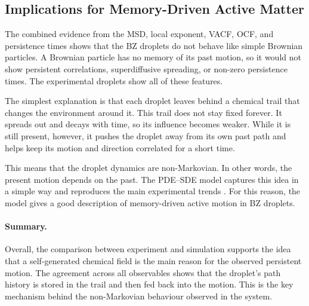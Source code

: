 \subsection{Implications for Memory-Driven Active Matter}
\label{subsec:comp_implications}

The combined evidence from the MSD, local exponent, VACF, OCF, and persistence times shows that the BZ droplets do not behave like simple Brownian particles. A Brownian particle has no memory of its past motion\cite{klafter2011,resnick1992}, so it would not show persistent correlations, superdiffusive spreading, or non-zero persistence times. The experimental droplets show all of these features.

The simplest explanation is that each droplet leaves behind a chemical trail that changes the environment around it. This trail does not stay fixed forever. It spreads out and decays with time, so its influence becomes weaker. While it is still present, however, it pushes the droplet away from its own past path and helps keep its motion and direction correlated for a short time.

This means that the droplet dynamics are non-Markovian\cite{schutz2004,balakrishnan2021}. In other words, the present motion depends on the past. The PDE--SDE model captures this idea in a simple way and reproduces the main experimental trends \cite{droplet2025}. For this reason, the model gives a good description of memory-driven active motion in BZ droplets.

\paragraph{Summary.}
Overall, the comparison between experiment and simulation supports the idea that a self-generated chemical field is the main reason for the observed persistent motion\cite{droplet2025}. The agreement across all observables shows that the droplet's path history is stored in the trail and then fed back into the motion. This is the key mechanism behind the non-Markovian behaviour observed in the system.
